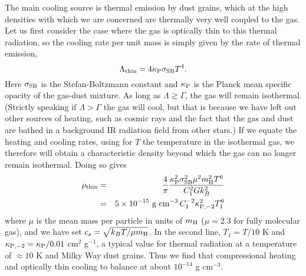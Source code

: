 The main cooling source is thermal emission by dust grains, which at the high densities with which we are concerned are thermally very well coupled to the gas. Let us first consider the case where the gas is optically thin to this thermal radiation, so the cooling rate per unit mass is simply given by the rate of thermal emission,
\begin{equation}
\Lambda_{\rm thin} = 4\kappa_{\rm P} \sigma_{\rm SB} T^4.
\end{equation}
Here $\sigma_{\rm SB}$ is the Stefan-Boltzmann constant and $\kappa_{\rm P}$ is the Planck mean specific opacity of the gas-dust mixture. As long as $\Lambda \gtrsim \Gamma$, the gas will remain isothermal. (Strictly speaking if $\Lambda > \Gamma$ the gas will cool, but that is because we have left out other sources of heating, such as cosmic rays and the fact that the gas and dust are bathed in a background IR radiation field from other stars.) If we equate the heating and cooling rates, using for $T$ the temperature in the isothermal gas, we therefore will obtain a characteristic density beyond which the gas can no longer remain isothermal. Doing so gives
\begin{eqnarray}
\rho_{\rm thin} & = & \frac{4}{\pi} \frac{\kappa_{\rm P}^2 \sigma_{\rm SB}^2 \mu^2 m_{\rm H}^2 T^6}{C_1^2 G k_B^2} \\
& = & 5\times 10^{-15} \mbox{ g cm}^{-3}\, C_1^{-2} \kappa_{\rm P,-2}^2 T_1^6
\end{eqnarray}
where $\mu$ is the mean mass per particle in units of $m_{\rm H}$ ($\mu=2.3$ for fully molecular gas), and we have set $c_s = \sqrt{k_B T/\mu m_{\rm H}}$. In the second line, $T_1 = T/10$ K and $\kappa_{\rm P,-2} = \kappa_{\rm P}/0.01$ cm$^2$ g$^{-1}$, a typical value for thermal radiation at a temperature of $\approx 10$ K and Milky Way dust grains. Thus we find that compressional heating and optically thin cooling to balance at about $10^{-14}$ g cm$^{-3}$.


